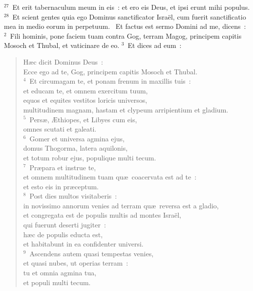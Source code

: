${}^{27}$~Et erit tabernaculum meum in eis~: et ero eis Deus, et ipsi erunt mihi populus.
${}^{28}$~Et scient gentes quia ego Dominus sanctificator Isra\"el, cum fuerit sanctificatio mea in medio eorum in perpetuum.
~Et factus est sermo Domini ad me, dicens~:
${}^{2}$~Fili hominis, pone faciem tuam contra Gog, terram Magog, principem capitis Mosoch et Thubal, et vaticinare de eo.
${}^{3}$~Et dices ad eum~: \begin{flushleft}\begin{verse}H\ae c dicit Dominus Deus~:\\ Ecce ego ad te, Gog, principem capitis Mosoch et Thubal.\\
${}^{4}$~Et circumagam te, et ponam frenum in maxillis tuis~:\\ et educam te, et omnem exercitum tuum,\\ equos et equites vestitos loricis universos,\\ multitudinem magnam, hastam et clypeum arripientium et gladium.\\
${}^{5}$~Pers\ae , \AE thiopes, et Libyes cum eis,\\ omnes scutati et galeati.\\
${}^{6}$~Gomer et universa agmina ejus,\\ domus Thogorma, latera aquilonis,\\ et totum robur ejus, populique multi tecum.\\
${}^{7}$~Pr\ae para et instrue te,\\ et omnem multitudinem tuam qu\ae\ coacervata est ad te~:\\ et esto eis in pr\ae ceptum.\\
${}^{8}$~Post dies multos visitaberis~:\\ in novissimo annorum venies ad terram qu\ae\ reversa est a gladio,\\ et congregata est de populis multis ad montes Isra\"el,\\ qui fuerunt deserti jugiter~:\\ h\ae c de populis educta est,\\ et habitabunt in ea confidenter universi.\\
${}^{9}$~Ascendens autem quasi tempestas venies,\\ et quasi nubes, ut operias terram~:\\ tu et omnia agmina tua,\\ et populi multi tecum.\end{verse}\end{flushleft}


